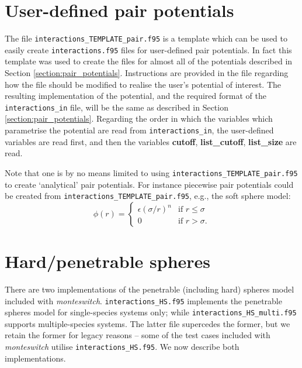 \documentclass{report}
\begin{document}
\section{User-defined pair potentials}\label{sec:user_defined}
The file \texttt{interactions\_TEMPLATE\_pair.f95} is a template which can be used to easily create \texttt{interactions.f95} files for user-defined
pair potentials. In fact this template was used to create the files for almost all of the potentials described in Section
\ref{section:pair_potentials}. Instructions are provided in the file regarding how the file should be modified to realise the user's potential
of interest. The resulting implementation of the potential, and the required format of the \texttt{interactions\_in} file, will be the same as described 
in Section \ref{section:pair_potentials}. Regarding the order in which the variables which parametrise the potential are read from 
\texttt{interactions\_in}, the user-defined variables are read first, and then the variables \textbf{cutoff}, \textbf{list\_cutoff}, 
\textbf{list\_size} are read.

Note that one is by no means limited to using \texttt{interactions\_TEMPLATE\_pair.f95} to create `analytical' pair potentials. For instance
piecewise pair potentials could be created from \texttt{interactions\_TEMPLATE\_pair.f95}, e.g., the soft sphere model:
\begin{equation}
\phi(r)=
\begin{cases} 
\epsilon(\sigma/r)^n & \text{if }r\leq\sigma \\
0 & \text{if }r>\sigma.
\end{cases}
\end{equation}


\section{Hard/penetrable spheres}
There are two implementations of the penetrable (including hard) spheres model included with \emph{monteswitch}.
\texttt{interactions\_HS.f95} implements the penetrable spheres model for single-species systems only; while 
\texttt{interactions\_HS\_multi.f95} supports multiple-species systems. The latter file supercedes the former, but we retain
the former for legacy reasons -- some of the test cases included with \emph{monteswitch} utilise \texttt{interactions\_HS.f95}.
We now describe both implementations.
\end{document}
